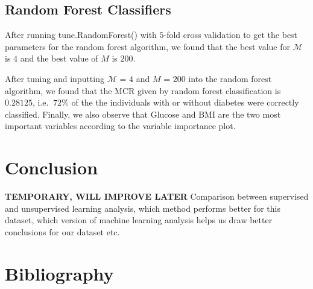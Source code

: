 \documentclass[12pt]{article}
\begin{document}

\subsection{Random Forest Classifiers}

After running tune.RandomForest() with $5$-fold cross validation to get the best parameters for the random forest algorithm, we found that the best value for $\mathcal{M}$ is $4$ and the best value of $M$ is $200$. 

After tuning and inputting $\mathcal{M}$ = $4$ and $M$ = $200$ into the random forest algorithm, we found that the MCR given by random forest classification is $0.28125$, i.e. $~72\%$ of the the individuals with or without diabetes were correctly classified.
Finally, we also observe that Glucose and BMI are the two most important variables according to the variable importance plot.



\section{Conclusion}

\textbf{TEMPORARY, WILL IMPROVE LATER} Comparison between supervised and unsupervised learning analysis, which method performs better for this dataset, which version of machine learning analysis helps us draw better conclusions for our dataset etc. 

 \section{Bibliography}
  
 
\end{document}
